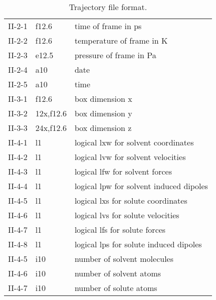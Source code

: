 \begin{table}[h]
\begin{center}
\begin{tabular*}{150mm}{p{15mm}p{12mm}l}
\hline
II-2-1 & f12.6  & time of frame in ps \\
II-2-2 & f12.6  & temperature of frame in K \\
II-2-3 & e12.5  & pressure of frame in Pa \\
II-2-4 & a10    & date \\
II-2-5 & a10    & time \\
\hline
II-3-1 & f12.6  & box dimension x \\
\hline
II-3-2 & 12x,f12.6  & box dimension y \\
\hline
II-3-3 & 24x,f12.6  & box dimension z \\
\hline
II-4-1 & l1     & logical lxw for solvent coordinates \\
II-4-2 & l1     & logical lvw for solvent velocities \\
II-4-3 & l1     & logical lfw for solvent forces \\
II-4-4 & l1     & logical lpw for solvent induced dipoles \\
II-4-5 & l1     & logical lxs for solute coordinates \\
II-4-6 & l1     & logical lvs for solute velocities \\
II-4-7 & l1     & logical lfs for solute forces \\
II-4-8 & l1     & logical lps for solute induced dipoles \\
II-4-5 & i10    & number of solvent molecules \\
II-4-6 & i10    & number of solvent atoms \\
II-4-7 & i10    & number of solute atoms \\
\hline\hline
\end{tabular*}
\caption{Trajectory file format.\label{tbl:nwmdtrj}}
\end{center}
\end{table}


